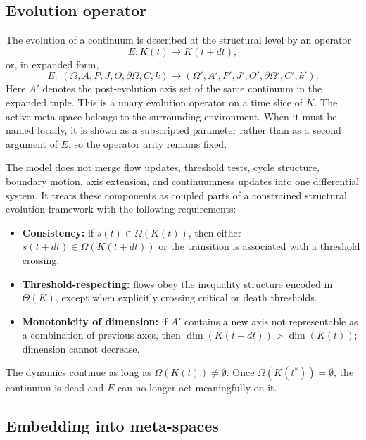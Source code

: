 \subsection{Evolution operator}

The evolution of a continuum is described at the structural level by an operator
\[
    E: K(t) \mapsto K(t+dt),
\]
or, in expanded form,
\[
    E:\ (\Omega,A,P,J,\Theta,\partial\Omega,C,k)
    \longrightarrow (\Omega',A',P',J',\Theta',\partial\Omega',C',k').
\]
Here \(A'\) denotes the post-evolution axis set of the same continuum in the
expanded tuple.
This is a unary evolution operator on a time slice of \(K\). The active
meta-space belongs to the surrounding environment. When it must be named
locally, it is shown as a subscripted parameter rather than as a second
argument of \(E\), so the operator arity remains fixed.

The model does not merge flow updates, threshold tests, cycle structure,
boundary motion, axis extension, and continuumness updates into one
differential system. It treats these components as coupled parts of a
constrained structural evolution framework with the following requirements:

\begin{itemize}
    \item \textbf{Consistency:} if \(s(t) \in \Omega(K(t))\), then either \(s(t+dt) \in \Omega(K(t+dt))\) or the transition is associated with a threshold crossing.
    \item \textbf{Threshold-respecting:} flows obey the inequality structure encoded in \(\Theta(K)\), except when explicitly crossing critical or death thresholds.
    \item \textbf{Monotonicity of dimension:} if \(A'\) contains a new axis not representable as a combination of previous axes, then \(\dim(K(t+dt)) > \dim(K(t))\); dimension cannot decrease.
\end{itemize}

The dynamics continue as long as \(\Omega(K(t)) \neq \emptyset\).
Once \(\Omega(K(t^\ast)) = \emptyset\), the continuum is dead and \(E\) can no longer act meaningfully on it.

\subsection{Embedding into meta-spaces}

